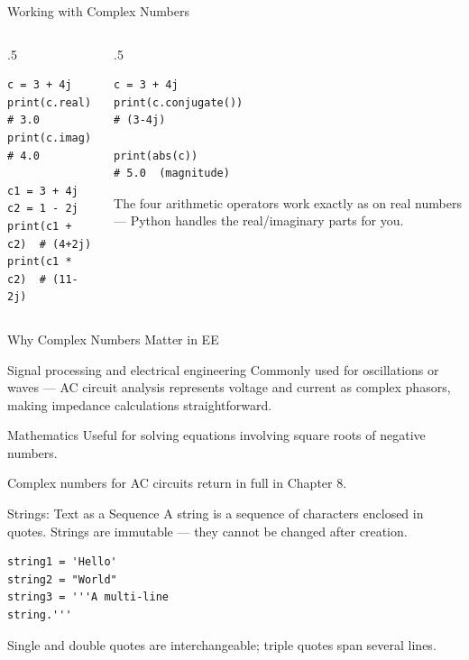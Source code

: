 \documentclass[9pt,aspectratio=169,xcolor=table]{beamer}
\begin{document}
\begin{frame}[fragile]{Working with Complex Numbers}
    \leavevmode
    \begin{columns}[t]
        \begin{column}{.5\textwidth}
\begin{lstlisting}
c = 3 + 4j
print(c.real)  # 3.0
print(c.imag)  # 4.0

c1 = 3 + 4j
c2 = 1 - 2j
print(c1 + c2)  # (4+2j)
print(c1 * c2)  # (11-2j)
\end{lstlisting}
        \end{column}
        \begin{column}{.5\textwidth}
\begin{lstlisting}
c = 3 + 4j
print(c.conjugate())
# (3-4j)

print(abs(c))
# 5.0  (magnitude)
\end{lstlisting}
            \vspace{2mm}
            {\small The four arithmetic operators work exactly as on
            real numbers --- Python handles the real/imaginary parts for
            you.}
        \end{column}
    \end{columns}
\end{frame}

\begin{frame}{Why Complex Numbers Matter in EE}
    \leavevmode
    \begin{block}{Signal processing and electrical engineering}
        \small Commonly used for oscillations or waves --- AC circuit
        analysis represents voltage and current as complex phasors,
        making impedance calculations straightforward.
    \end{block}

    \vspace{3mm}
    \begin{block}{Mathematics}
        \small Useful for solving equations involving square roots of
        negative numbers.
    \end{block}

    \vspace{3mm}
    {\small Complex numbers for AC circuits return in full in Chapter 8.}
\end{frame}

\begin{frame}[fragile]{Strings: Text as a Sequence}
    \leavevmode
    A \alert{string} is a sequence of characters enclosed in quotes.
    Strings are \alert{immutable} --- they cannot be changed after
    creation.

\begin{lstlisting}
string1 = 'Hello'
string2 = "World"
string3 = '''A multi-line
string.'''
\end{lstlisting}

    \vspace{1mm}
    {\small Single and double quotes are interchangeable; triple quotes
    span several lines.}
\end{frame}
\end{document}
